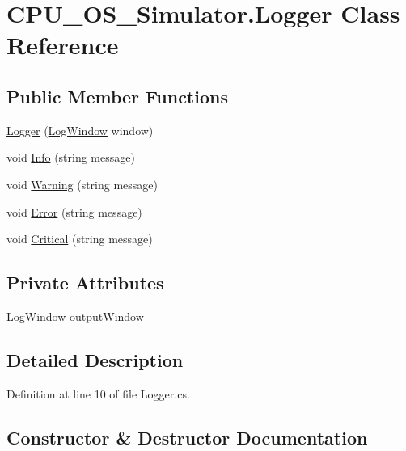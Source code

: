 \hypertarget{class_c_p_u___o_s___simulator_1_1_logger}{}\section{C\+P\+U\+\_\+\+O\+S\+\_\+\+Simulator.\+Logger Class Reference}
\label{class_c_p_u___o_s___simulator_1_1_logger}
\subsection*{Public Member Functions}
\begin{DoxyCompactItemize}
\item 
\hyperlink{class_c_p_u___o_s___simulator_1_1_logger_a23f931daf4bb74e1f38548a1ad1922f7}{Logger} (\hyperlink{class_c_p_u___o_s___simulator_1_1_log_window}{Log\+Window} window)
\item 
void \hyperlink{class_c_p_u___o_s___simulator_1_1_logger_a19bb4ee091421be6e9a0dbd28cf5b20e}{Info} (string message)
\item 
void \hyperlink{class_c_p_u___o_s___simulator_1_1_logger_aebaa4d8c45212099a4eb316213595824}{Warning} (string message)
\item 
void \hyperlink{class_c_p_u___o_s___simulator_1_1_logger_ac719581a670763455fc4d3ea2fa13d84}{Error} (string message)
\item 
void \hyperlink{class_c_p_u___o_s___simulator_1_1_logger_a123779cfe49398d1e03be03991b8337e}{Critical} (string message)
\end{DoxyCompactItemize}
\subsection*{Private Attributes}
\begin{DoxyCompactItemize}
\item 
\hyperlink{class_c_p_u___o_s___simulator_1_1_log_window}{Log\+Window} \hyperlink{class_c_p_u___o_s___simulator_1_1_logger_acbd4acecaad3094385f8527483e0a9ab}{output\+Window}
\end{DoxyCompactItemize}


\subsection{Detailed Description}


Definition at line 10 of file Logger.\+cs.



\subsection{Constructor \& Destructor Documentation}
\hypertarget{class_c_p_u___o_s___simulator_1_1_logger_a23f931daf4bb74e1f38548a1ad1922f7}{}
